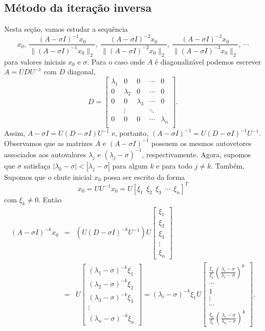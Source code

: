 \subsection{Método da iteração inversa}
Nesta seção, vamos estudar a sequência
$$
x_0,\ \frac{(A-\sigma I)^{-1}x_0}{\|(A-\sigma I)^{-1}x_0\|_2},\ \frac{(A-\sigma I)^{-2}x_0}{\|(A-\sigma I)^{-2}x_0\|_2},\ \frac{(A-\sigma I)^{-3}x_0}{\|(A-\sigma I)^{-3}x_0\|_2},\ \cdots
$$
para valores iniciais $x_0$ e $\sigma$. Para o caso onde $A$ é diagonalizável podemos escrever $A=UDU^{-1}$ com $D$ diagonal,
$$
D=\left[\begin{array}{ccccc}
\lambda_1&0&0&\cdots&0\\
0&\lambda_2&0&\cdots&0\\
0&  0&\lambda_3&\cdots&0\\
 &\vdots& &\ddots&\\
 0&  0&0&\cdots&\lambda_n\\
\end{array}\right].
$$
Assim, $A-\sigma I=U(D-\sigma I)U^{-1}$ e, portanto, $(A-\sigma I)^{-1}=U(D-\sigma I)^{-1}U^{-1}$. Observamos que as matrizes $A$ e $(A-\sigma I)^{-1}$ possuem os mesmos autovetores associados aos autovalores $\lambda_j$ e $(\lambda_j-\sigma)^{-1}$, respectivamente. Agora, supomos que $\sigma$ satisfaça $|\lambda_k-\sigma|<|\lambda_j-\sigma|$ para algum $k$ e para todo $j\neq k$.  Também, Supomos que o chute inicial $x_0$ possa ser escrito da forma
$$
x_0=UU^ {-1}x_0=U[\xi_1\ \ \xi_2\ \ \xi_3\ \ \cdots \ \ \xi_n]^T
$$
com $\xi_k\neq 0$. Então
\begin{eqnarray*}
(A-\sigma I)^{-k}x_0&=&(U(D-\sigma I)^{-k }U^{-1} )U\left[\begin{array}{c}\xi_1\\ \xi_2\\ \xi_3\\ \vdots \\ \xi_n\end{array}\right]\\&=&U\left[\begin{array}{c}(\lambda_1-\sigma)^{-k}\xi_1\\ (\lambda_2-\sigma)^{-k}\xi_2\\ (\lambda_3-\sigma)^{-k}\xi_3\\ \vdots \\ (\lambda_n-\sigma)^{-k}\xi_n\end{array}\right]=(\lambda_i-\sigma)^{-k}\xi_1U\left[\begin{array}{c}\frac{\xi_1}{\xi_i}\left(\frac{\lambda_i-\sigma}{\lambda_1-\sigma}\right)^k\\ \cdots\\ 1\\ \vdots \\ \cdots \\ \frac{\xi_n}{\xi_i}\left(\frac{\lambda_i-\sigma}{\lambda_n-\sigma}\right)^k \end{array}\right].
\end{eqnarray*}
